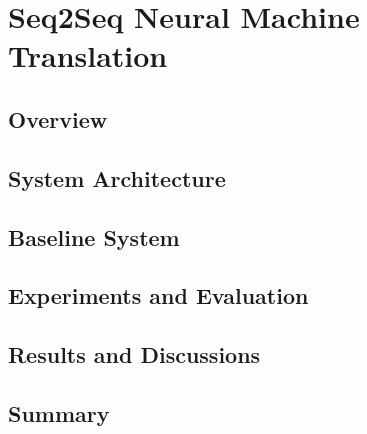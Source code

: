 \chapter{Seq2Seq Neural Machine Translation}
\pagestyle{fancy}
\pagestyle{fancy}\chead{} \pagestyle{fancy}\rhead{}
\pagestyle{fancy} 
\pagestyle{fancy}\cfoot{} \pagestyle{fancy}\rfoot{\thepage}
\section{Overview}\label{start6}

\section{System Architecture}
\section{Baseline System}
\section{Experiments and Evaluation}
\section{Results and Discussions}

\section{Summary}

